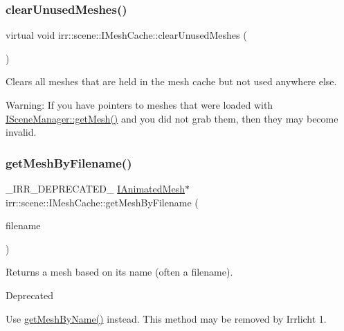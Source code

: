 \subsubsection{\texorpdfstring{clear\+Unused\+Meshes()}{clearUnusedMeshes()}}
{\footnotesize\ttfamily virtual void irr\+::scene\+::\+I\+Mesh\+Cache\+::clear\+Unused\+Meshes (\begin{DoxyParamCaption}{ }\end{DoxyParamCaption})\hspace{0.3cm}{\ttfamily [pure virtual]}}



Clears all meshes that are held in the mesh cache but not used anywhere else. 

Warning\+: If you have pointers to meshes that were loaded with \hyperlink{classirr_1_1scene_1_1ISceneManager_a63894c3f3d46cfc385116f1705935e03}{I\+Scene\+Manager\+::get\+Mesh()} and you did not grab them, then they may become invalid. \mbox{\label{classirr_1_1scene_1_1IMeshCache_aa3946324e39cc074b1f73e01d57cae70}} 
\subsubsection{\texorpdfstring{get\+Mesh\+By\+Filename()}{getMeshByFilename()}}
{\footnotesize\ttfamily \+\_\+\+I\+R\+R\+\_\+\+D\+E\+P\+R\+E\+C\+A\+T\+E\+D\+\_\+ \hyperlink{classirr_1_1scene_1_1IAnimatedMesh}{I\+Animated\+Mesh}$\ast$ irr\+::scene\+::\+I\+Mesh\+Cache\+::get\+Mesh\+By\+Filename (\begin{DoxyParamCaption}\item[{const \hyperlink{namespaceirr_1_1io_ab1bdc45edb3f94d8319c02bc0f840ee1}{io\+::path} \&}]{filename }\end{DoxyParamCaption})\hspace{0.3cm}{\ttfamily [inline]}}



Returns a mesh based on its name (often a filename). 

\begin{DoxyRefDesc}{Deprecated}
\item[\hyperlink{deprecated__deprecated000009}{Deprecated}]Use \hyperlink{classirr_1_1scene_1_1IMeshCache_a4c93e736bdca8c84d478afc82540d6bb}{get\+Mesh\+By\+Name()} instead. This method may be removed by Irrlicht 1. \end{DoxyRefDesc}
\mbox{\label{classirr_1_1scene_1_1IMeshCache_a06e7755013445f9bc3d7339fbd009e31}} 
